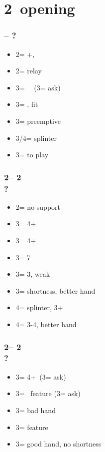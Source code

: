 \documentclass[12pt, a4paper]{report}
\begin{document}
\section*{\colorbox{blue!30}{2\hearts\ opening}}
 {

    \subsubsection*{\alrts{2\hearts} -- ?}
    \begin{itemize}
        \item 2\spades = +, \fton{3\hearts}
        \item 2\nt = relay
        \item 3\clubs = \minor\ \gf\ (3\diams = ask)
        \item 3\diams = \invp, \hearts fit
        \item 3\hearts = preemptive
        \item 3\spades/4\minor = splinter
        \item 3\nt = to play
    \end{itemize}

    \subsubsection*{2\hearts -- 2\spades\\
                    ?}
    \begin{itemize}
        \item 2\nt = no \spades support
        \item 3\clubs = 4+
        \item 3\diams = 4+
        \item 3\hearts = 7\hearts
        \item 3\spades = 3\spades, weak
        \item 3\nt = \spades shortness, better hand
        \item 4\minor = splinter, 3+\spades
        \item 4\spades = 3-4\spades, better hand
    \end{itemize}

    \subsubsection*{2\hearts -- 2\nt\\
                    ?}
    \begin{itemize}
        \item 3\clubs = 4+\minor\ (3\diams = ask)
        \item 3\diams = \minor\ feature (3\hearts = ask)
        \item 3\hearts = bad hand
        \item 3\spades = \spades feature
        \item 3\nt = good hand, no shortness
    \end{itemize}

}
\end{document}
